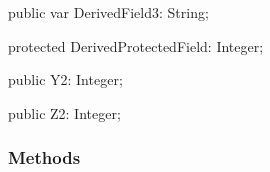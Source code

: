 \documentclass{report}
\newif\ifpdf
\begin{document}
\begin{list}{}
\begin{flushleft}
\ifpdf
\end{flushleft}
\fi


\par  \label{ok_inherited_members.TDerived-DerivedField3}
\item[\textbf{DerivedField3}\hfill]
\ifpdf
\begin{flushleft}
\fi
\begin{ttfamily}
public var DerivedField3: String;\end{ttfamily}

\ifpdf
\end{flushleft}
\fi


\par  \label{ok_inherited_members.TDerived-DerivedProtectedField}
\item[\textbf{DerivedProtectedField}\hfill]
\ifpdf
\begin{flushleft}
\fi
\begin{ttfamily}
protected DerivedProtectedField: Integer;\end{ttfamily}

\ifpdf
\end{flushleft}
\fi


\par  \label{ok_inherited_members.TDerived-Y2}
\item[\textbf{Y2}\hfill]
\ifpdf
\begin{flushleft}
\fi
\begin{ttfamily}
public Y2: Integer;\end{ttfamily}

\ifpdf
\end{flushleft}
\fi


\par  \label{ok_inherited_members.TDerived-Z2}
\item[\textbf{Z2}\hfill]
\ifpdf
\begin{flushleft}
\fi
\begin{ttfamily}
public Z2: Integer;\end{ttfamily}

\ifpdf
\end{flushleft}
\fi


\par  \end{list}
\subsubsection*{\large{\textbf{Methods}}\normalsize\hspace{1ex}\hfill}
\end{document}
